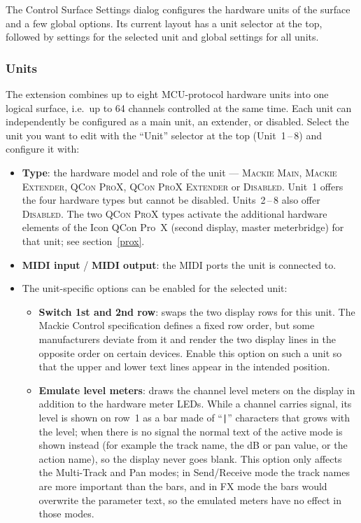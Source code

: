 The Control Surface Settings dialog configures the hardware units of
the surface and a few global options. Its current layout has a unit
selector at the top, followed by settings for the selected unit and
global settings for all units.

\subsubsection{Units}\label{units}
The extension combines up to eight MCU-protocol hardware units into
one logical surface, i.e.\ up to 64 channels controlled at the same time.
Each unit can independently be configured as a main unit, an extender,
or disabled. Select the unit you want to edit with the ``Unit'' selector
at the top (Unit~1\,--\,8) and configure it with:
\begin{itemize}
\item \textbf{Type}: the hardware model and role of the unit ---
  \textsc{Mackie Main}, \textsc{Mackie Extender}, \textsc{QCon ProX},
  \textsc{QCon ProX Extender} or \textsc{Disabled}. Unit~1 offers the
  four hardware types but cannot be disabled. Units~2\,--\,8 also offer
  \textsc{Disabled}. The two \textsc{QCon ProX} types activate the
  additional hardware elements of the Icon QCon Pro~X (second display,
  master meterbridge) for that unit; see section~\ref{prox}.
\item \textbf{MIDI input} / \textbf{MIDI output}: the MIDI ports the
  unit is connected to.
\item The unit-specific options can be enabled for the selected
  unit:
  \begin{itemize}
  \item \textbf{Switch 1st and 2nd row}: swaps the two display rows
    for this unit. The Mackie Control specification defines a fixed row
    order, but some manufacturers deviate from it and render the two
    display lines in the opposite order on certain devices. Enable this
    option on such a unit so that the upper and lower text lines appear
    in the intended position.
  \item \textbf{Emulate level meters}: draws the channel level meters
    on the display in addition to the hardware meter LEDs. While a
    channel carries signal, its level is shown on row~1 as a bar made of
    ``\texttt{|}'' characters that grows with the level; when there is
    no signal the normal text of the active mode is shown instead (for
    example the track name, the dB or pan value, or the action name), so
    the display never goes blank. This option only affects the
    Multi-Track and Pan modes; in Send/Receive mode the track names are
    more important than the bars, and in FX mode the bars would
    overwrite the parameter text, so the emulated meters have no effect
    in those modes.
  \end{itemize}
\end{itemize}
